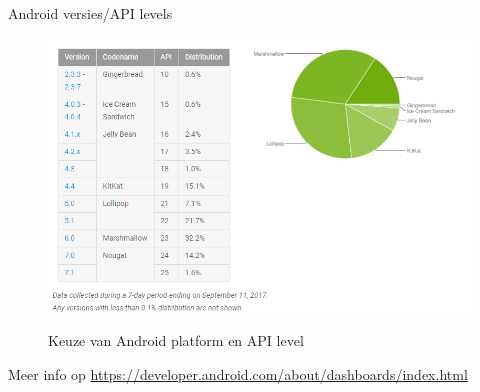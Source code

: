 \documentclass{beamer}
\begin{document}
\begin{frame}{Android versies/API levels }
\begin{figure}[ht]
	\centering
	\includegraphics[width=\textwidth]{img/hello/api_levels.png}
	\label{fig:apilevels}
	\caption{Keuze van Android platform en API level}
\end{figure}
Meer info op \url{https://developer.android.com/about/dashboards/index.html
}	
\end{frame}
\end{document}
